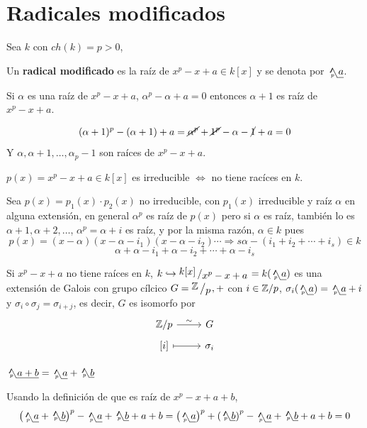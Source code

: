 \section{Radicales modificados}
Sea $k$ con $ch(k) = p > 0$, \begin{defi}
    Un \textbf{radical modificado} es la ra\'iz de $x^p - x+a\in k[x]$ y se denota por $\usqrt[p]{a}$. 
\end{defi}
\begin{prop}
    Si $\alpha$ es una ra\'iz de $x^p-x+a$, $\alpha^p-\alpha+a=0$ entonces $\alpha+1$ es ra\'iz de $x^p-x+a$.
\end{prop}
\begin{dem}$$
        (\alpha+1)^p-(\alpha+1)+a = \cancel{\alpha^p} + \cancel{1^p} - \alpha - \cancel{1} + a=0$$
        Y $\alpha, \alpha+1, \ldots, \alpha_p-1$ son ra\'ices de $x^p-x+a$.
\end{dem}
\begin{prop}
    $p(x) = x^p-x+a \in k[x]$ es irreducible $\iff$ no tiene rac\'ices en $k$.
\end{prop}
\begin{dem}
    Sea $p(x) = p_1(x) \cdot p_2(x)$ no irreducible, con $p_1(x)$ irreducible y ra\'iz $\alpha$ en alguna extensi\'on, en general $\alpha^p$ es ra\'iz de $p(x)$ pero si $\alpha$ es ra\'iz, tambi\'en lo es $\alpha+1, \alpha+2, \ldots$, $\alpha^p = \alpha+i$ es ra\'iz, y por la misma raz\'on, $\alpha \in k$ pues 
    $$p(x) = (x-\alpha)(x-\alpha-i_1)(x-\alpha-i_2)\cdots \Rightarrow s\alpha - (i_1+i_2 +\cdots+ i_s) \in k$$
    $$\alpha+\alpha-i_1 + \alpha-i_2 + \cdots + \alpha-i_s$$

    Si $x^p-x+a$ no tiene ra\'ices en $k$, $k \hookrightarrow \modulo{k[x]}{x^p-x+a} = k(\usqrt[p]{a})$ es una extensi\'on de Galois con grupo c\'ilcico $G = \modulo{\bb Z}{p}, +$ con $i \in \mathbb{Z}/p$, $\sigma_i(\usqrt[p]{a}) = \usqrt[p]{a} + i$ y $\sigma_i \circ \sigma_j = \sigma_{i+j}$, es decir, $G$ es isomorfo por
    $$\bt \bb Z/p \rar{\sim} & G \\[-5mm] [i] \rarmaps & \sigma_i \et$$
\end{dem}
\begin{propi}
$\usqrt[p]{a+b} = \usqrt[p]{a} + \usqrt[p]{b}$
\end{propi}
    \begin{dem}
    Usando la definici\'on de que es ra\'iz de $x^p-x+a+b$,
    $$\left( \usqrt[p]{a} + \usqrt[p]{b} \right)^p - \usqrt[p]{a} + \usqrt[p]{b} + a+ b =  \left( \usqrt[p]{a} \right)^p + \left( \usqrt[p]{b} \right)^p - \usqrt[p]{a} + \usqrt[p]{b} + a+ b = 0 $$    
    \end{dem}
